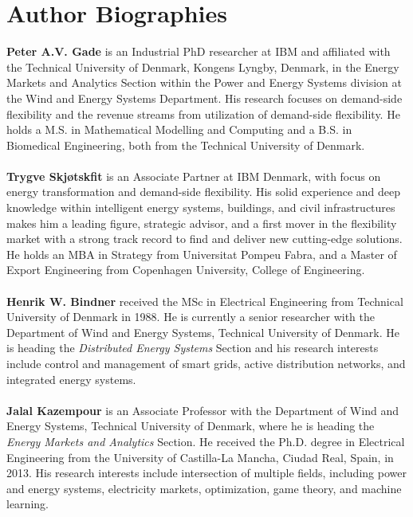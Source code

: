 \documentclass[11pt,a4paper]{article}
\begin{document}

\section*{Author Biographies}

\textbf{Peter A.V. Gade} is an Industrial PhD researcher at IBM and affiliated with the Technical University of Denmark, Kongens Lyngby, Denmark, in the Energy Markets and Analytics Section within the Power and Energy Systems division at the Wind and Energy Systems Department. His research focuses on demand-side flexibility and the revenue streams from utilization of demand-side flexibility. He holds a M.S. in Mathematical Modelling and Computing and a B.S. in Biomedical Engineering, both from the Technical University of Denmark.
\\
\\
\textbf{Trygve Skjøtskfit} is an Associate Partner at IBM Denmark, with focus on energy transformation and demand-side flexibility. His solid experience and deep knowledge within intelligent energy systems, buildings, and civil infrastructures makes him a leading figure, strategic advisor, and a first mover in the flexibility market with a strong track record to find and deliver new cutting-edge solutions. He holds an MBA in Strategy from Universitat Pompeu Fabra, and a Master of Export Engineering from Copenhagen University, College of Engineering.
\\
\\
\textbf{Henrik W. Bindner} received the MSc in Electrical Engineering from Technical University of Denmark in 1988. He is currently a senior researcher with the Department of Wind and Energy Systems, Technical University of Denmark. He is heading the \textit{Distributed Energy Systems} Section and his research interests include control and management of smart grids, active distribution networks, and integrated energy systems.
\\
\\
\textbf{Jalal Kazempour}  is an Associate Professor with the Department of Wind and Energy Systems, Technical University of Denmark, where he is heading the \textit{Energy Markets and Analytics} Section. He received the Ph.D. degree in Electrical Engineering from the University of Castilla-La Mancha, Ciudad Real, Spain, in 2013. His research interests include intersection of multiple fields, including power and energy systems, electricity markets, optimization, game theory, and machine learning.
\end{document}
